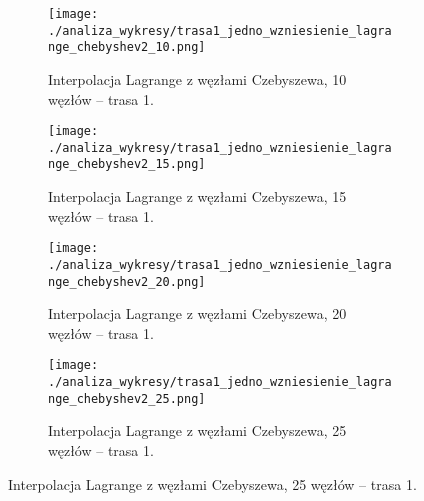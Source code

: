\documentclass[a4paper,12pt]{article}
\begin{document}
\begin{figure}[H]
    \centering
    \begin{subfigure}{0.45\textwidth}
        \centering
        \texttt{[image: ./analiza\_wykresy/trasa1\_jedno\_wzniesienie\_lagrange\_chebyshev2\_10.png]}
        \caption{Interpolacja Lagrange z węzłami Czebyszewa, 10 węzłów – trasa 1.}
    \end{subfigure}\hfill
    \begin{subfigure}{0.45\textwidth}
        \centering
        \texttt{[image: ./analiza\_wykresy/trasa1\_jedno\_wzniesienie\_lagrange\_chebyshev2\_15.png]}
        \caption{Interpolacja Lagrange z węzłami Czebyszewa, 15 węzłów – trasa 1.}
    \end{subfigure}
    
    \vspace{0.5cm}
    
    \begin{subfigure}{0.45\textwidth}
        \centering
        \texttt{[image: ./analiza\_wykresy/trasa1\_jedno\_wzniesienie\_lagrange\_chebyshev2\_20.png]}
        \caption{Interpolacja Lagrange z węzłami Czebyszewa, 20 węzłów – trasa 1.}
    \end{subfigure}\hfill
    \begin{subfigure}{0.45\textwidth}
        \centering
        \texttt{[image: ./analiza\_wykresy/trasa1\_jedno\_wzniesienie\_lagrange\_chebyshev2\_25.png]}
        \caption{Interpolacja Lagrange z węzłami Czebyszewa, 25 węzłów – trasa 1.}
    \end{subfigure}
\end{figure}
\end{document}
